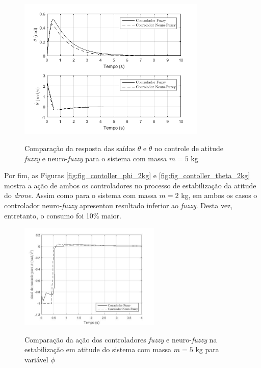 \begin{figure}[!htb]
    \centering
    \caption{Comparação da resposta das saídas $\theta$ e $\dot{\theta}$ no controle de atitude \textit{fuzzy} e neuro-\textit{fuzzy} para o sistema com massa $m=5$ kg}
    \includegraphics[width=0.8\textwidth]{./04-figuras/resultados/novos/atitude_theta_thetadot_5kg_10s}
    \label{fig:atitude_theta_thetadot_5kg_10s}
\end{figure}

Por fim, as Figuras \ref{fig:fig_contoller_phi_2kg} e \ref{fig:fig_contoller_theta_2kg} mostra a ação de ambos os controladores no processo de estabilização da atitude do \textit{drone}. Assim como para o sistema com massa $m=2$ kg, em ambos os casos o controlador neuro-\textit{fuzzy} apresentou resultado inferior ao \textit{fuzzy}. Desta vez, entretanto, o consumo foi 10\% maior.

\begin{figure}[!htb]
    \centering
    \caption{Comparação da ação dos controladores \textit{fuzzy} e neuro-\textit{fuzzy} na estabilização em atitude do sistema com massa $m=5$ kg para variável $\phi$}
    \includegraphics[width=0.6\textwidth]{./04-figuras/figuras_pos_banca/4-atitude5kg/fig_contoller_phi_5kg}
    \label{fig:fig_contoller_phi_5kg}
\end{figure}


